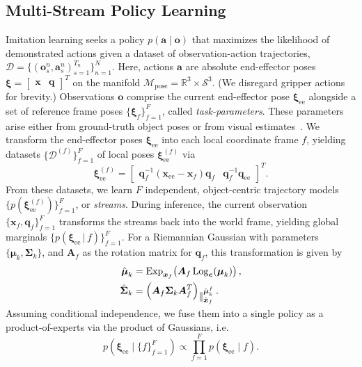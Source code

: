 \documentclass[letterpaper, 10 pt, journal, twoside]{IEEEtran}
\newcommand{\pose}{\boldsymbol{\xi}}
\newcommand{\quaternion}{\boldsymbol{q}}
\newcommand{\ee}{\mathrm{ee}}
\newcommand{\mani}{\mathcal{M}}
\begin{document}
\subsection{Multi-Stream Policy Learning}
%
Imitation learning seeks a policy \(p(\boldsymbol{a}\mid\boldsymbol{o})\) that maximizes the likelihood of demonstrated actions given a dataset of observation-action trajectories, \(\mathcal{D}=\{(\boldsymbol o_s^n, \boldsymbol a_s^n)_{s=1}^{T_n}\}_{n=1}^N\).
Here, actions \(\boldsymbol{a}\) are absolute end-effector poses \(\pose=\begin{bmatrix}\boldsymbol x & \quaternion\end{bmatrix}^T\) on the manifold \(\mani_{\text{pose}}=\mathbb{R}^3\times\mathcal{S}^3\).
(We disregard gripper actions for brevity.)
Observations \(\boldsymbol{o}\) comprise the current end-effector pose \(\pose_\ee\) alongside a set of reference frame poses \(\{\pose_f\}_{f=1}^F\), called \emph{task-parameters}.
These parameters arise either from ground-truth object poses or from visual estimates~\cite{von2024art, von2025unreasonable}.
%
We transform the end-effector poses \(\pose_\ee\) into each local coordinate frame \(f\), yielding datasets \(\{\mathcal{D}^{(f)}\}_{f=1}^F\) of local poses \(\pose_\ee^{(f)}\) via
\begin{equation}\label{eq:frametrans}
    \pose_\ee^{(f)} = \begin{bmatrix}
    \quaternion_f^{-1} (\boldsymbol x_\ee  - \boldsymbol x _f) \quaternion_f & 
    \quaternion_f^{-1} \quaternion_\ee
    \end{bmatrix}^T.
\end{equation}
%
From these datasets, we learn \(F\) independent, object-centric trajectory models \(\{p(\pose_\ee^{(f)})\}_{f=1}^F\), or \emph{streams}.
%
During inference, the current observation \(\{\boldsymbol x_f, \boldsymbol q_f\}_{f=1}^F\) transforms the streams back into the world frame, yielding global marginals \(\{p(\pose_\ee\,|\, f)\}_{f=1}^F\).
%
For a Riemannian Gaussian with parameters \(\{\boldsymbol\mu_k, \boldsymbol\Sigma_k\}\), and \(\boldsymbol A_f\) as the rotation matrix for \(\boldsymbol q_f\), this transformation is given by
%
%
%
%
%
%
%
%
%
%
\begin{equation}
\label{eq:gaussiantrans}
\begin{aligned}
    \hat{\boldsymbol\mu}_k
    &= \operatorname{Exp}_{\boldsymbol x_f}
       \!\left(
       \boldsymbol A_f
       \operatorname{Log}_{\boldsymbol e}
       (\boldsymbol\mu_k)
       \right),\\
    \hat{\boldsymbol\Sigma}_k
    &= \left(
       \boldsymbol A_f
       \boldsymbol\Sigma_k
       \boldsymbol A_f^T
       \right)_{\smash{\raise0.3ex\hbox{$\Vert_{\hat{\boldsymbol x}_f}^{\hat{\boldsymbol\mu}_k^f}$}}}.
\end{aligned}
\end{equation}
%
%
%
Assuming conditional independence, we fuse them into a single policy as a product-of-experts via the product of Gaussians, i.e.\
\begin{equation}\label{eq:comb}
   p\left(\pose_\ee\mid \{f\}_{f=1}^F\right) \propto \prod_{f=1}^F p(\pose_\ee\mid f).
\end{equation}
%
\end{document}
